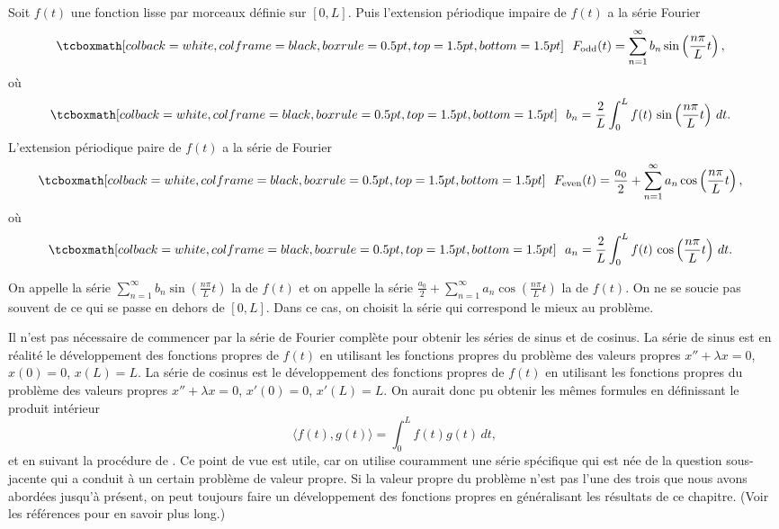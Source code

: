 \begin{theorem}
Soit $f(t)$ une fonction lisse par morceaux définie sur $[0,L]$.
Puis l'extension périodique impaire
de $f(t)$ a la série Fourier
\begin{equation*}
\mybxbg{~~
F_{\text{odd}}(t) = \sum_{n=1}^\infty b_n \sin \left( \frac{n \pi}{L} t
\right) ,
~~}
\end{equation*}
où
\begin{equation*}
\mybxbg{~~
b_n = 
\frac{2}{L} \int_{0}^L f(t)\, \sin \left( \frac{n \pi}{L} t \right) \, dt .
~~}
\end{equation*}
L'extension périodique paire de $f (t)$ a la série de Fourier
\begin{equation*}
\mybxbg{~~
F_{\text{even}}(t) = \frac{a_0}{2} + \sum_{n=1}^\infty a_n \cos \left(
\frac{n \pi}{L} t \right) ,
~~}
\end{equation*}
où
\begin{equation*}
\mybxbg{~~
a_n = 
\frac{2}{L} \int_{0}^L f(t)\, \cos \left( \frac{n \pi}{L} t \right) \, dt .
~~}
\end{equation*}
\end{theorem}

On appelle la série $\sum_{n=1}^\infty b_n \sin \left( \frac{n \pi}{L} t\right)$ 
la \emph{} de  $f(t)$ et on appelle la série
$\frac{a_0}{2} + \sum_{n=1}^\infty a_n \cos \left( \frac{n \pi}{L} t
\right)$
la \emph{} de $f(t)$.  
On ne se soucie pas souvent de ce qui se passe en dehors de $ [0, L] $. Dans ce cas,
on choisit la série qui correspond le mieux au problème.

Il n'est pas nécessaire de commencer par la série de Fourier complète pour obtenir
les séries de sinus et de cosinus. La série de sinus est en réalité le développement des fonctions propres de $ f (t) $ en utilisant les
fonctions propres du problème des valeurs propres $x''+\lambda x = 0$, $x(0) = 0$,
$x(L) = L$.  La série de cosinus est le développement des fonctions propres de $ f (t) $
en utilisant les fonctions propres du problème des valeurs propres $x''+\lambda x = 0$, $x'(0) = 0$,
$x'(L) = L$.  On aurait donc pu obtenir les mêmes formules
en définissant le produit intérieur
\begin{equation*}
\langle f(t), g(t) \rangle = \int_0^L f(t) g(t) \, dt ,
\end{equation*}
et en suivant la procédure de .  Ce point de vue est
utile, car on utilise couramment une série spécifique qui est née de la question sous-jacente qui a
conduit à un certain problème de valeur propre. Si la valeur propre du
problème n'est pas l'une des trois que nous avons abordées jusqu'à présent, on peut toujours faire un
développement des fonctions propres en généralisant les résultats de ce chapitre. (Voir les références pour en savoir plus long.)

